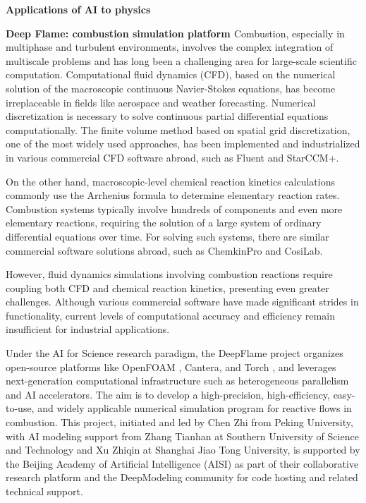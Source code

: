 {\Large \textbf{Applications of AI to physics}}

\textbf{Deep Flame: combustion simulation platform \cite{mao2023deepflame}}
Combustion, especially in multiphase and turbulent environments, involves the complex integration of multiscale problems and has long been a challenging area for large-scale scientific computation. Computational fluid dynamics (CFD), based on the numerical solution of the macroscopic continuous Navier-Stokes equations, has become irreplaceable in fields like aerospace and weather forecasting. Numerical discretization is necessary to solve continuous partial differential equations computationally. The finite volume method based on spatial grid discretization, one of the most widely used approaches, has been implemented and industrialized in various commercial CFD software abroad, such as Fluent and StarCCM+.

On the other hand, macroscopic-level chemical reaction kinetics calculations commonly use the Arrhenius formula to determine elementary reaction rates. Combustion systems typically involve hundreds of components and even more elementary reactions, requiring the solution of a large system of ordinary differential equations over time. For solving such systems, there are similar commercial software solutions abroad, such as ChemkinPro \cite{designs2011chemkin} and CosiLab.

However, fluid dynamics simulations involving combustion reactions require coupling both CFD and chemical reaction kinetics, presenting even greater challenges. Although various commercial software have made significant strides in functionality, current levels of computational accuracy and efficiency remain insufficient for industrial applications.

Under the AI for Science research paradigm, the DeepFlame project organizes open-source platforms like OpenFOAM \cite{jasak2007openfoam}, Cantera, and Torch \cite{collobert2002torch}, and leverages next-generation computational infrastructure such as heterogeneous parallelism and AI accelerators. The aim is to develop a high-precision, high-efficiency, easy-to-use, and widely applicable numerical simulation program for reactive flows in combustion. This project, initiated and led by Chen Zhi from Peking University, with AI modeling support from Zhang Tianhan at Southern University of Science and Technology and Xu Zhiqin at Shanghai Jiao Tong University, is supported by the Beijing Academy of Artificial Intelligence (AISI) as part of their collaborative research platform and the DeepModeling community for code hosting and related technical support.

